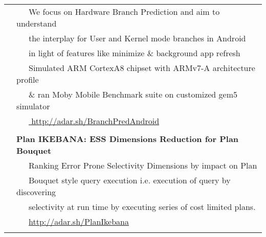 \documentclass[a4paper,10pt]{article} %
\begin{document}
\begin{tabular}{rl}
& ~~~We focus on Hardware Branch Prediction and aim to understand\\
& ~~~the interplay for User and Kernel mode branches in Android\\
& ~~~in light of features like minimize \& background app refresh\\
& ~~~Simulated ARM CortexA8 chipset with ARMv7-A architecture profile\\
& ~~~\& ran Moby Mobile Benchmark suite on customized gem5 simulator\\
& ~~~\href{http://adar.sh/BranchPredAndroid}{ http://adar.sh/BranchPredAndroid} \\
&\\
& \textbf{Plan IKEBANA: ESS Dimensions Reduction for Plan Bouquet} \\
& ~~~Ranking Error Prone Selectivity Dimensions by impact on Plan\\
& ~~~Bouquet style query execution i.e. execution of query by discovering \\
& ~~~selectivity at run time by executing series of cost limited plans.\\
& ~~~\href{http://adar.sh/PlanIkebana}{http://adar.sh/PlanIkebana}\\
& \\

\end{tabular}
\end{document}
